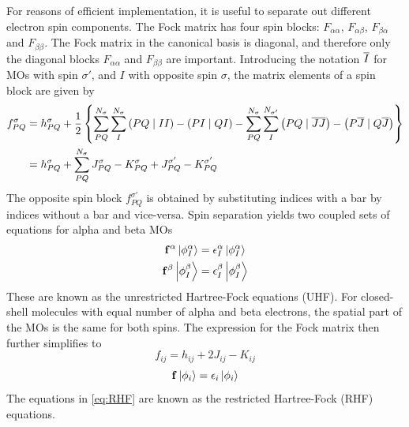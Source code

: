 For reasons of efficient implementation, it is useful to separate out different electron spin components. The Fock matrix has four spin blocks: $F_{\alpha\alpha}$, $F_{\alpha\beta}$, $F_{\beta\alpha}$ and $F_{\beta\beta}$. The Fock matrix in the canonical basis is diagonal, and therefore only the diagonal blocks  $F_{\alpha\alpha}$ and $F_{\beta\beta}$ are important. Introducing the notation $\overline{I}$ for MOs with spin $\sigma'$, and $I$ with opposite spin $\sigma$, the matrix elements of a spin block are given by
\begin{equation}
\begin{split}
f_{PQ}^{\sigma} &= h_{PQ}^{\sigma} + \frac{1}{2} \left\lbrace \sum^{N_{\sigma}}_{PQ}\sum^{N_{\sigma}}_{I} \left( PQ \mid II \right) - \left( PI \mid QI \right)  - \sum^{N_{\sigma}}_{PQ}\sum^{N_{\sigma'}}_{I} \left( PQ \mid \overline{J}\overline{J} \right) - \left( P\overline{J} \mid Q\overline{J} \right) \right\rbrace \\
&= h_{PQ}^{\sigma} + \sum^{N_{\sigma}}_{PQ} J^{\sigma}_{PQ} - K^{\sigma}_{PQ} + J^{\sigma'}_{PQ} - K^{\sigma'}_{PQ}
\end{split}
\end{equation}
\noindent The opposite spin block $f_{PQ}^{\sigma'}$ is obtained by substituting indices with a bar by indices without a bar and vice-versa. Spin separation yields two coupled sets of equations for alpha and beta MOs
\begin{equation}
\begin{split}
\mathbf{f}^{\alpha} \ket{\phi^{\alpha}_I} &= \epsilon^{\alpha}_I \ket{\phi^{\alpha}_I} \\
\mathbf{f}^{\beta} \ket{\phi^{\beta}_I} &= \epsilon^{\beta}_I \ket{\phi^{\beta}_I} 
\end{split}
\label{eq:UHF}
\end{equation} 
\noindent These are known as the unrestricted Hartree-Fock equations (UHF). For closed-shell molecules with equal number of alpha and beta electrons, the spatial part of the MOs is the same for both spins. The expression for the Fock matrix then further simplifies to 
\begin{equation}
f_{ij} = h_{ij} + 2J_{ij} - K_{ij} 
\end{equation}
\begin{equation}
\mathbf{f} \ket{\phi_i} = \epsilon_i \ket{\phi_i}
\label{eq:RHF}
\end{equation}
\noindent The equations in \ref{eq:RHF} are known as the restricted Hartree-Fock (RHF) equations. 

